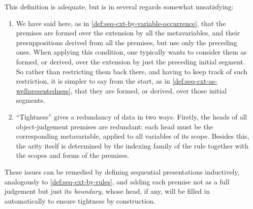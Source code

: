This definition is adequate, but is in several regards somewhat unsatisfying:
%
\begin{enumerate}
\item
  We have said here, as in \cref{def:seq-cxt-by-variable-occurrence}, that the premises are formed over the extension by all the metavariables, and their presuppositions derived from all the premises, but use only the preceding ones.
  When applying this condition, one typically wants to consider them as formed, or derived, over the extension by just the preceding initial segment. So rather than restricting them back there, and having to keep track of such restriction, it is simpler to say from the start, as in \cref{def:seq-cxt-as-wellpresentedness}, that they are formed, or derived, over those initial segments.
  
\item “Tightness” gives a redundancy of data in two ways.
  Firstly, the heads of all object-judgement premises are redundant: each head must be the corresponding metavariable, applied to all variables of its scope.
  Besides this, the arity itself is determined by the indexing family of the rule together with the scopes and forms of the premises.
\end{enumerate}

These issues can be remedied by defining sequential presentations inductively, analogously to \cref{def:seq-cxt-by-rules}, and adding each premise not as a full judgement but just its \emph{boundary}, whose head, if any, will be filled in automatically to ensure tightness by construction.

